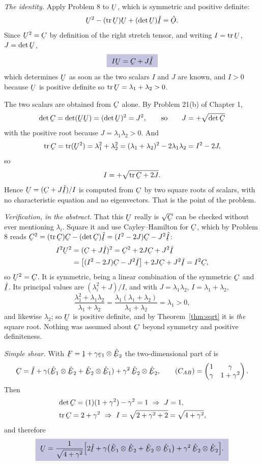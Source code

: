 \begin{solution}
\emph{The identity.} Apply Problem 8 to $\bU$, which is symmetric and
positive definite:
\[
   \bU^{2}-(\tr\bU)\bU+(\det\bU)\hI=\hOb .
\]
Since $\bU^{2}=\bC$ by definition of the right stretch tensor, and writing
$I=\tr\bU$, $J=\det\bU$,
\[
   \boxed{\ I\bU=\bC+J\hI\ }
\]
which determines $\bU$ as soon as the two scalars $I$ and $J$ are known,
and $I>0$ because $\bU$ is positive definite so $\tr\bU=\lambda_{1}
+\lambda_{2}>0$.

The two scalars are obtained from $\bC$ alone. By Problem 21(b) of
Chapter 1,
\[
   \det\bC=\det(\bU\bU)=(\det\bU)^{2}=J^{2},
   \qquad\text{so}\qquad J=+\sqrt{\det\bC}
\]
with the positive root because $J=\lambda_{1}\lambda_{2}>0$. And
\[
   \tr\bC=\tr(\bU^{2})=\lambda_{1}^{2}+\lambda_{2}^{2}
   =(\lambda_{1}+\lambda_{2})^{2}-2\lambda_{1}\lambda_{2}=I^{2}-2J,
\]
so
\[
   I=+\sqrt{\tr\bC+2J} .
\]
Hence $\bU=(\bC+J\hI)/I$ is computed from $\bC$ by two square roots of
scalars, with no characteristic equation and no eigenvectors. That is the
point of the problem.

\emph{Verification, in the abstract.} That this $\bU$ really is
$\sqrt{\bC}$ can be checked without ever mentioning $\lambda_{i}$. Square
it and use Cayley--Hamilton for $\bC$, which by Problem 8 reads
$\bC^{2}=(\tr\bC)\bC-(\det\bC)\hI=(I^{2}-2J)\bC-J^{2}\hI$:
\[
\begin{aligned}
   I^{2}\bU^{2}&=(\bC+J\hI)^{2}=\bC^{2}+2J\bC+J^{2}\hI\\
   &=\big[(I^{2}-2J)\bC-J^{2}\hI\big]+2J\bC+J^{2}\hI
   =I^{2}\bC ,
\end{aligned}
\]
so $\bU^{2}=\bC$. It is symmetric, being a linear combination of the
symmetric $\bC$ and $\hI$. Its principal values are
$(\lambda_{i}^{2}+J)/I$, and with $J=\lambda_{1}\lambda_{2}$,
$I=\lambda_{1}+\lambda_{2}$,
\[
   \frac{\lambda_{1}^{2}+\lambda_{1}\lambda_{2}}
        {\lambda_{1}+\lambda_{2}}
   =\frac{\lambda_{1}(\lambda_{1}+\lambda_{2})}{\lambda_{1}+\lambda_{2}}
   =\lambda_{1}>0 ,
\]
and likewise $\lambda_{2}$; so $\bU$ is positive definite, and by
Theorem~\ref{thm:sqrt} it is \emph{the} square root. Nothing was assumed
about $\bC$ beyond symmetry and positive definiteness.

\smallskip
\emph{Simple shear.} With $\bF=\shift+\gamma\be_{1}\otimes\hbE_{2}$ the
two-dimensional part of  is
\[
   \bC=\hI+\gamma(\hbE_{1}\otimes\hbE_{2}+\hbE_{2}\otimes\hbE_{1})
      +\gamma^{2}\,\hbE_{2}\otimes\hbE_{2},
   \qquad
   (C_{AB})=\begin{pmatrix}1&\gamma\\ \gamma&1+\gamma^{2}\end{pmatrix}.
\]
Then
\[
\begin{aligned}
   &\det\bC=(1)(1+\gamma^{2})-\gamma^{2}=1\ \Rightarrow\ J=1,\\
   &\tr\bC=2+\gamma^{2}\ \Rightarrow\
     I=\sqrt{2+\gamma^{2}+2}=\sqrt{4+\gamma^{2}},
\end{aligned}
\]
and therefore
\[
   \boxed{\ \bU=\frac{1}{\sqrt{4+\gamma^{2}}}
     \Big[2\hI+\gamma\big(\hbE_{1}\otimes\hbE_{2}
     +\hbE_{2}\otimes\hbE_{1}\big)
     +\gamma^{2}\,\hbE_{2}\otimes\hbE_{2}\Big] .\ }
\]


\end{solution}
